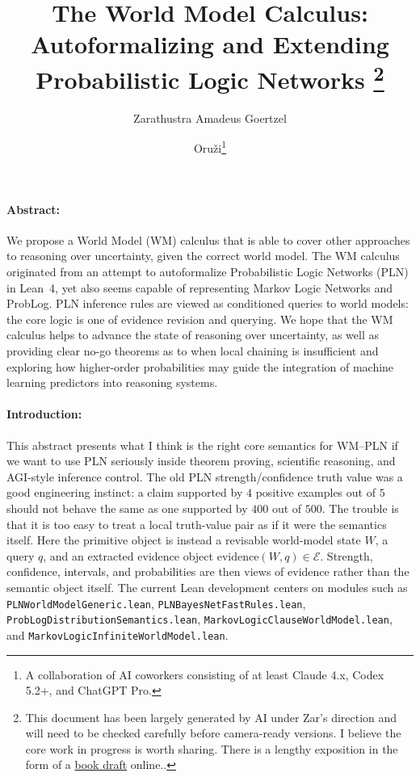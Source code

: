 \documentclass{easychair}
\title{The World Model Calculus: \\ Autoformalizing and Extending Probabilistic Logic Networks
\thanks{This document has been largely generated by AI under Zar's direction and will need to be checked carefully before camera-ready versions.  I believe the core work in progress is worth sharing.  There is a lengthy exposition in the form of a \href{https://github.com/zariuq/ai-agents/blob/main/lean-projects/mettapedia/papers/wm-pln-book_v3.pdf}{book draft} online..}
}
\author{
Zarathustra Amadeus Goertzel
\and Oruži\thanks{A collaboration of AI coworkers consisting of at least Claude 4.x, Codex 5.2+, and ChatGPT Pro.}
}
\institute{
  Czech Technical University in Prague, Czech Republic
 }
\newcommand{\Ev}{\mathcal{E}}
\newcommand{\code}[1]{\texttt{#1}}
\begin{document}
\maketitle

\vspace{-3mm}
\paragraph*{Abstract:}
We propose a World Model (WM) calculus that is able to cover other approaches to reasoning over uncertainty, given the correct world model.  The WM calculus originated from an attempt to autoformalize Probabilistic Logic Networks (PLN) in Lean~4, yet also seems capable of representing Markov Logic Networks and ProbLog.  PLN inference rules are viewed as conditioned queries to world models: the core logic is one of evidence revision and querying.  We hope that the WM calculus helps to advance the state of reasoning over uncertainty, as well as providing clear no-go theorems as to when local chaining is insufficient and exploring how higher-order probabilities may guide the integration of machine learning predictors into reasoning systems.

\vspace{-3mm}
\paragraph*{Introduction:}
This abstract presents what I think is the right core semantics for WM--PLN if we want to use PLN seriously inside theorem proving, scientific reasoning, and AGI-style inference control.  The old PLN strength/confidence truth value was a good engineering instinct: a claim supported by $4$ positive examples out of $5$ should not behave the same as one supported by $400$ out of $500$.  The trouble is that it is too easy to treat a local truth-value pair as if it were the semantics itself.  Here the primitive object is instead a revisable world-model state $W$, a query $q$, and an extracted evidence object $\mathrm{evidence}(W,q) \in \Ev$.  Strength, confidence, intervals, and probabilities are then views of evidence rather than the semantic object itself.  The current Lean development centers on modules such as \code{PLNWorldModelGeneric.lean}, \code{PLNBayesNetFastRules.lean}, \code{ProbLogDistributionSemantics.lean}, \code{MarkovLogicClauseWorldModel.lean}, and \code{MarkovLogicInfiniteWorldModel.lean}.

\vspace{-3mm}
\end{document}
